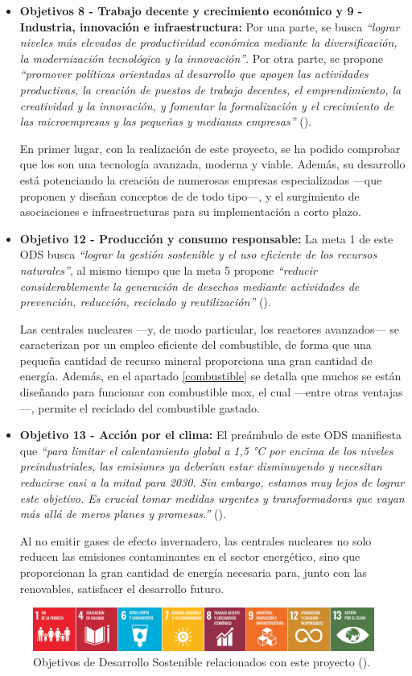 \begin{itemize}
    \item \textbf{Objetivos 8 - Trabajo decente y crecimiento económico y 9 - Industria, innovación e infraestructura:} Por una parte, se busca \textit{``lograr niveles más elevados de productividad económica mediante la diversificación, la modernización tecnológica y la innovación''}. Por otra parte, se propone \textit{``promover políticas orientadas al desarrollo que apoyen las actividades productivas, la creación de puestos de trabajo decentes, el emprendimiento, la creatividad y la innovación, y fomentar la formalización y el crecimiento de las microempresas y las pequeñas y medianas empresas''} (\cite{ODS}).
    
    En primer lugar, con la realización de este proyecto, se ha podido comprobar que los  son una tecnología avanzada, moderna y viable. Además, su desarrollo está potenciando la creación de numerosas empresas especializadas ---que proponen y diseñan conceptos de  de todo tipo---, y el surgimiento de asociaciones e infraestructuras para su implementación a corto plazo.

    \item \textbf{Objetivo 12 - Producción y consumo responsable:} La meta 1 de este ODS busca \textit{``lograr la gestión sostenible y el uso eficiente de los recursos naturales''}, al mismo tiempo que la meta 5 propone \textit{``reducir considerablemente la generación de desechos mediante actividades de prevención, reducción, reciclado y reutilización''} (\cite{ODS}).
    
    Las centrales nucleares ---y, de modo particular, los reactores avanzados--- se caracterizan por un empleo eficiente del combustible, de forma que una pequeña cantidad de recurso mineral proporciona una gran cantidad de energía. Además, en el apartado \ref{combustible} se detalla que muchos  se están diseñando para funcionar con combustible \acrshort{mox}, el cual ---entre otras ventajas---, permite el reciclado del combustible gastado. 
    
    \item \textbf{Objetivo 13 - Acción por el clima:} El preámbulo de este ODS manifiesta que \textit{``para limitar el calentamiento global a 1,5 °C por encima de los niveles preindustriales, las emisiones ya deberían estar disminuyendo y necesitan reducirse casi a la mitad para 2030. Sin embargo, estamos muy lejos de lograr este objetivo.
    Es crucial tomar medidas urgentes y transformadoras que vayan más allá de meros planes y promesas.''} (\cite{ODS}).

    Al no emitir gases de efecto invernadero, las centrales nucleares no solo reducen las emisiones contaminantes en el sector energético, sino que proporcionan la gran cantidad de energía necesaria para, junto con las renovables, satisfacer el desarrollo futuro.
\end{itemize}

\begin{figure}[h!]
    \centering
    \includegraphics[width=\textwidth]{content/figures/ODS_TFG.png}
    \caption{Objetivos de Desarrollo Sostenible relacionados con este proyecto (\cite{ODS}).}
    \label{fig:ods_tfg}
  \end{figure}